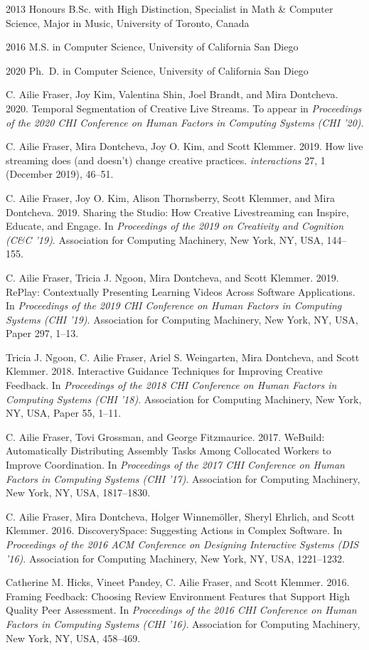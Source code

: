 \begin{vita}
  \item[2013] Honours B.Sc. with High Distinction, Specialist in Math \& Computer Science, Major in Music, University of Toronto, Canada
  \item[2016] M.S. in Computer Science, University of California San Diego
  \item[2020] Ph.~D. in Computer Science, University of California San Diego
\end{vita}
\begin{publications}
\item C. Ailie Fraser, Joy Kim, Valentina Shin, Joel Brandt, and Mira Dontcheva. 2020. Temporal Segmentation of Creative Live Streams. To appear in \textit{Proceedings of the 2020 CHI Conference on Human Factors in Computing Systems (CHI '20)}.
\item C. Ailie Fraser, Mira Dontcheva, Joy O. Kim, and Scott Klemmer. 2019. How live streaming does (and doesn't) change creative practices. \textit{interactions} 27, 1 (December 2019), 46–51.
\item C. Ailie Fraser, Joy O. Kim, Alison Thornsberry, Scott Klemmer, and Mira Dontcheva. 2019. Sharing the Studio: How Creative Livestreaming can Inspire, Educate, and Engage. In \textit{Proceedings of the 2019 on Creativity and Cognition (C\&C '19)}. Association for Computing Machinery, New York, NY, USA, 144–155.
\item C. Ailie Fraser, Tricia J. Ngoon, Mira Dontcheva, and Scott Klemmer. 2019. RePlay: Contextually Presenting Learning Videos Across Software Applications. In \textit{Proceedings of the 2019 CHI Conference on Human Factors in Computing Systems (CHI '19)}. Association for Computing Machinery, New York, NY, USA, Paper 297, 1–13.
\item Tricia J. Ngoon, C. Ailie Fraser, Ariel S. Weingarten, Mira Dontcheva, and Scott Klemmer. 2018. Interactive Guidance Techniques for Improving Creative Feedback. In \textit{Proceedings of the 2018 CHI Conference on Human Factors in Computing Systems (CHI '18)}. Association for Computing Machinery, New York, NY, USA, Paper 55, 1–11.
\item C. Ailie Fraser, Tovi Grossman, and George Fitzmaurice. 2017. WeBuild: Automatically Distributing Assembly Tasks Among Collocated Workers to Improve Coordination. In \textit{Proceedings of the 2017 CHI Conference on Human Factors in Computing Systems (CHI '17)}. Association for Computing Machinery, New York, NY, USA, 1817–1830.
\item C. Ailie Fraser, Mira Dontcheva, Holger Winnemöller, Sheryl Ehrlich, and Scott Klemmer. 2016. DiscoverySpace: Suggesting Actions in Complex Software. In \textit{Proceedings of the 2016 ACM Conference on Designing Interactive Systems (DIS '16)}. Association for Computing Machinery, New York, NY, USA, 1221–1232.
\item Catherine M. Hicks, Vineet Pandey, C. Ailie Fraser, and Scott Klemmer. 2016. Framing Feedback: Choosing Review Environment Features that Support High Quality Peer Assessment. In \textit{Proceedings of the 2016 CHI Conference on Human Factors in Computing Systems (CHI '16)}. Association for Computing Machinery, New York, NY, USA, 458–469.
\end{publications}